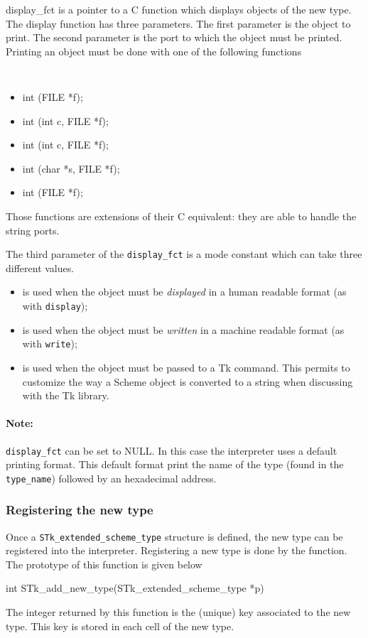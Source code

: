 \documentclass[10pt]{article}
\begin{document}
\begin{Lentry}
\item [display\_fct] is a pointer to a C function which displays objects of the
new type. The display function has three parameters. The first parameter is the
object to print. The second parameter is the port to which the object must be
printed. Printing an object must be done with one of the following functions
{\tt
\begin{itemize}
\item int  (FILE *f);
\item int  (int c, FILE *f);
\item int  (int c, FILE *f);
\item int  (char *s, FILE *f);
\item int  (FILE *f);
\end{itemize}
}
Those functions are extensions of their C equivalent: they are able to handle the
{\stk} string ports.

The third parameter of the {\tt display\_fct} is a mode constant which can take three
different values. 
\begin{itemize}
\item {} is used when the object must be {\em displayed} in a
human readable format (as with {\tt display});
\item {} is used when the object must be {\em written} in a
machine readable format (as with {\tt write});
\item {} is used when the object must be passed to a Tk
command. This permits to customize the way a Scheme object is converted to a
string when discussing with the Tk library.
\end{itemize}
\paragraph*{Note:} {\tt  display\_fct} can be set to NULL. In this
case the interpreter uses a default printing format. This default
format print the name of the type (found in the {\tt type\_name})
followed by an hexadecimal address.
\end{Lentry}
\subsubsection{Registering the new type}

Once a {\tt STk\_extended\_scheme\_type} structure is defined, the new type can
be registered into the interpreter. Registering a new type is done by the 
 function. 
The prototype of this function is given below
\begin{Code}
\begin{listing}[200]{2}
int STk_add_new_type(STk_extended_scheme_type *p)
\end{listing}
\end{Code}
The integer returned by this function is the (unique) key associated to the new
type. This key is stored in each cell of the new type.
\end{document}
